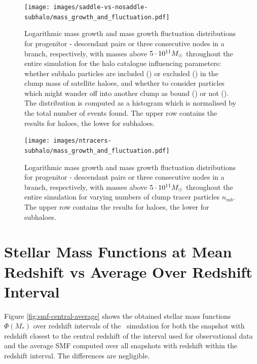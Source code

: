 \begin{appendices}
\begin{figure}[H]
	\centering
	\texttt{[image: images/saddle-vs-nosaddle-subhalo/mass\_growth\_and\_fluctuation.pdf]}%
	\caption{
		Logarithmic mass growth and mass growth fluctuation distributions for progenitor - descendant pairs or three consecutive nodes in a branch, respectively, with masses above $5\cdot 10^{11}M_\odot$ throughout the entire simulation for the halo catalogue influencing parameters: 
		whether subhalo particles are included (\inc) or excluded (\exc) in the clump mass of satellite haloes, and whether to consider particles which might wander off into another clump as bound (\nosad) or not (\sad).
		The distribution is computed as a histogram which is normalised by the total number of events found.
		The upper row contains the results for haloes, the lower for subhaloes.
	}%
	\label{fig:mass-growth-and-flucts-saddle-vs-nosaddle-subhalo}
\end{figure}



\begin{figure}[H]
	\centering
	\texttt{[image: images/ntracers-subhalo/mass\_growth\_and\_fluctuation.pdf]}%
	\caption{
		Logarithmic mass growth and mass growth fluctuation distributions for progenitor - descendant pairs or three consecutive nodes in a branch, respectively, with masses above $5\cdot 10^{11}M_\odot$ throughout the entire simulation for varying numbers of clump tracer particles $n_{mb}$.
		The upper row contains the results for haloes, the lower for subhaloes.
	}%
	\label{fig:mass-growth-and-flucts-ntracers-subhalo}
\end{figure}






















\section{Stellar Mass Functions at Mean Redshift vs Average Over Redshift Interval}\label{app:smf_variations}

Figure \ref{fig:smf-central-average} shows the obtained stellar mass functions $\Phi(M_*)$ over redshift intervals of the \gsmall\ simulation for both the snapshot with redshift closest to the central redshift of the interval used for observational data and the average SMF computed over all snapshots with redshift within the redshift interval.
The differences are negligible.





\end{appendices}
